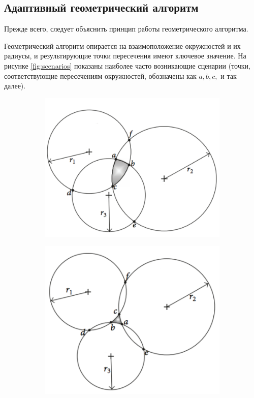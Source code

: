 \subsection{Адаптивный геометрический алгоритм}

Прежде всего, следует объяснить принцип работы геометрического алгоритма.

Геометрический алгоритм опирается на взаимоположение окружностей и их радиусы, и результирующие точки пересечения имеют ключевое значение. На рисунке \ref{fig:scenarios} показаны наиболее часто возникающие сценарии (точки, соответствующие пересечениям окружностей, обозначены как $a, b, c,$ и так далее). 

\begin{figure}
    \centering
    \begin{subfigure}[ht]{0.4\textwidth}
        \includegraphics[width=\textwidth]{img/circlesInter}
        \caption{}
        \label{fig:inter}
    \end{subfigure}
    \begin{subfigure}[ht]{0.4\textwidth}
        \includegraphics[width=\textwidth]{img/circlesOuter}

\end{subfigure}
\end{figure}
